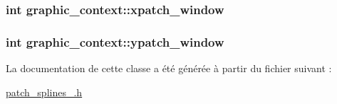 \hypertarget{classgraphic__context_a57a5bcca338d0b27c5014b9bde3f6e99}{
\subsubsection[{xpatch\+\_\+window}]{\setlength{\rightskip}{0pt plus 5cm}int graphic\+\_\+context\+::xpatch\+\_\+window}}\label{classgraphic__context_a57a5bcca338d0b27c5014b9bde3f6e99}
\hypertarget{classgraphic__context_ae902bd96df3912441f3f5e99cd802fbf}{
\subsubsection[{ypatch\+\_\+window}]{\setlength{\rightskip}{0pt plus 5cm}int graphic\+\_\+context\+::ypatch\+\_\+window}}\label{classgraphic__context_ae902bd96df3912441f3f5e99cd802fbf}


La documentation de cette classe a été générée à partir du fichier suivant \+:\begin{DoxyCompactItemize}
\item 
\hyperlink{patch__splines__2_8h}{patch\+\_\+splines\+\_.\+h}\end{DoxyCompactItemize}
